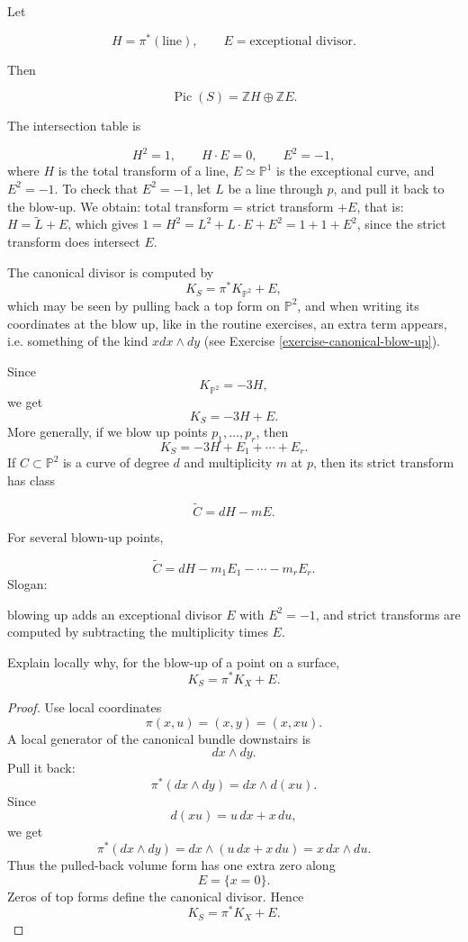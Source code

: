 Let

$$
  H=\pi^*(\text{line}),
  \qquad
  E=\text{exceptional divisor}.
$$

Then

$$
  \operatorname{Pic}(S)
  =
  \mathbb ZH\oplus \mathbb ZE.
$$

The intersection table is

$$
  H^2=1,
  \qquad
  H\cdot E=0,
  \qquad
  E^2=-1,
$$
where
$H$ is the total transform of a line,
$E\simeq \mathbb P^1$ is the exceptional
  curve, and
$E^2=-1$. To check that $E^2 = -1$,
let $L$ be a line through $p$, and pull
it back to the blow-up. We obtain:
total transform = strict transform $+ E$,
that is: $H = \tilde{L} + E$,
which gives $1 = H^2 = L^2 + L\cdot E + E^2
=1+1+E^2$, since the strict
transform does intersect $E$.

The canonical divisor is computed by
$$
K_S=\pi^*K_{\mathbb P^2}+E,
$$
which may be seen by pulling back
a top form on $\mathbb{P}^2$,
and when writing its coordinates
at the blow up, like in the routine
exercises, an extra term appears,
i.e. something of the kind $x dx \wedge dy$
(see Exercise
\ref{exercise-canonical-blow-up}).

Since
$$
K_{\mathbb P^2}=-3H,
$$
we get
$$
K_S=-3H+E.
$$
More generally, if we blow up points
$p_1,\ldots,p_r$, then
$$
 K_S=-3H+E_1+\cdots+E_r.
$$
If $C\subset \mathbb P^2$ is a curve of
degree $d$ and multiplicity $m$ at $p$,
then its strict transform has class

$$
\widetilde C=dH-mE.
$$

For several blown-up points,

$$
\widetilde C
=
dH-m_1E_1-\cdots-m_rE_r.
$$
Slogan:

blowing up adds an exceptional divisor
$E$ with $E^2=-1$, and strict transforms
are computed by subtracting the
multiplicity times $E$.

\begin{exercise}
\label{exercise-canonical-blow-up}
Explain locally why, for the blow-up of
a point on a surface,
$$
  K_S=\pi^*K_X+E.
$$
\end{exercise}

\begin{proof}
Use local coordinates
$$
  \pi(x,u)=(x,y)=(x,xu).
$$
A local generator of the canonical bundle
downstairs is
$$
  dx\wedge dy.
$$
Pull it back:
$$
  \pi^*(dx\wedge dy)
  =
  dx\wedge d(xu).
$$
Since
$$
  d(xu)=u\,dx+x\,du,
$$
we get
$$
  \pi^*(dx\wedge dy)
  =
  dx\wedge (u\,dx+x\,du)
  =
  x\,dx\wedge du.
$$
Thus the pulled-back volume form has one
extra zero along
$$
  E=\{x=0\}.
$$
Zeros of top forms define the canonical
divisor. Hence
$$
  K_S=\pi^*K_X+E.
$$
\end{proof}


